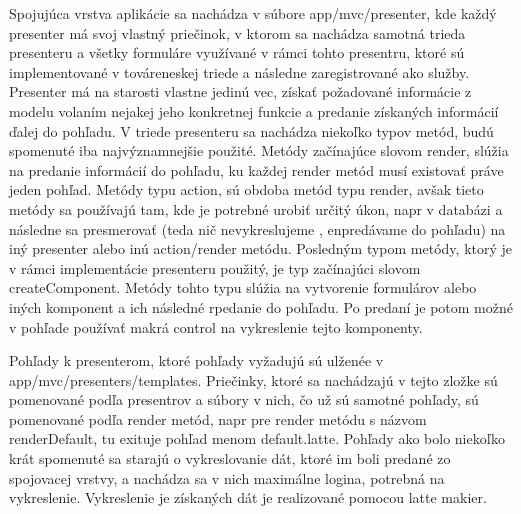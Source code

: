 Spojujúca vrstva aplikácie sa nachádza v súbore app/mvc/presenter, kde každý presenter má svoj vlastný priečinok, v ktorom sa nachádza samotná trieda presenteru a všetky formuláre využívané v rámci tohto presentru, ktoré sú implementované v továreneskej triede a následne zaregistrované ako služby. Presenter má na starosti vlastne jedinú vec, získať požadované informácie z modelu volaním nejakej jeho konkretnej funkcie a predanie získaných informácií ďalej do pohľadu. V triede presenteru sa nachádza niekoľko typov metód, budú spomenuté iba najvýznamnejšie použité. Metódy začínajúce slovom render, slúžia na predanie informácií do pohľadu, ku každej render metód musí existovať práve jeden pohľad. Metódy typu action, sú obdoba metód typu render, avšak tieto metódy sa používajú tam, kde je potrebné urobiť určitý úkon, napr v databázi a následne sa presmerovať (teda nič nevykreslujeme , enpredávame do pohľadu) na iný presenter alebo inú action/render metódu. Posledným typom metódy, ktorý je v rámci implementácie presenteru použitý, je typ začínajúci slovom createComponent. Metódy tohto typu slúžia na vytvorenie formulárov alebo iných komponent a ich následné rpedanie do pohľadu. Po predaní je potom možné v pohľade používať makrá {control} na vykreslenie tejto komponenty. 

Pohľady k presenterom, ktoré pohľady vyžadujú sú ulženée v app/mvc/presenters/templates. Priečinky, ktoré sa nachádzajú v tejto zložke sú pomenované podľa presentrov a súbory v nich, čo už sú samotné pohľady, sú pomenované podľa render metód, napr pre render metódu s názvom renderDefault, tu exituje pohľad menom default.latte. Pohľady ako bolo niekoľko krát spomenuté sa starajú o vykreslovanie dát, ktoré im boli predané zo spojovacej vrstvy, a nachádza sa v nich maximálne logina, potrebná na vykreslenie. Vykreslenie je získaných dát je realizované pomocou latte makier. 

